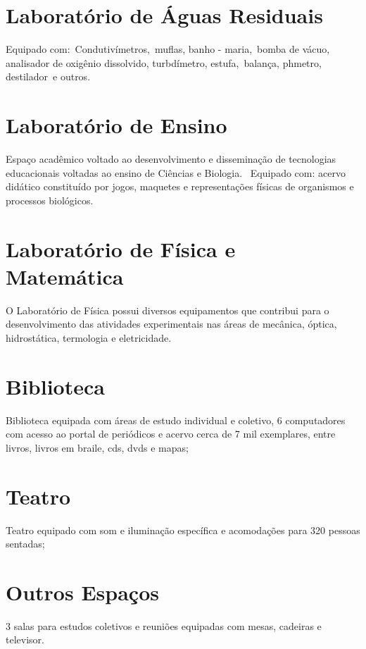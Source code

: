 \documentclass[11pt,fleqn]{book} %
\begin{document}
\section{Laboratório de Águas Residuais}
Equipado com: Condutivímetros, muflas, banho - maria, bomba de vácuo, analisador de oxigênio dissolvido, turbdímetro, estufa, balança, phmetro, destilador e outros.

\section{Laboratório de Ensino}
Espaço acadêmico voltado ao desenvolvimento e disseminação de tecnologias educacionais voltadas ao ensino de Ciências e Biologia.  Equipado com: acervo didático constituído por jogos, maquetes e representações físicas de organismos e processos biológicos.

\section{Laboratório de Física e Matemática}
O Laboratório de Física possui diversos equipamentos que contribui para o desenvolvimento das atividades experimentais nas áreas de mecânica, óptica, hidrostática, termologia e eletricidade.

\section{Biblioteca}
Biblioteca equipada com áreas de estudo individual e coletivo, 6 computadores com acesso ao portal de periódicos e acervo cerca de 7 mil exemplares, entre livros, livros em braile, cds, dvds e mapas;

\section{Teatro}
Teatro equipado com som e iluminação específica e acomodações para 320 pessoas sentadas;

\section{Outros Espaços}
3 salas para estudos coletivos e reuniões equipadas com mesas, cadeiras e televisor.


\end{document}
